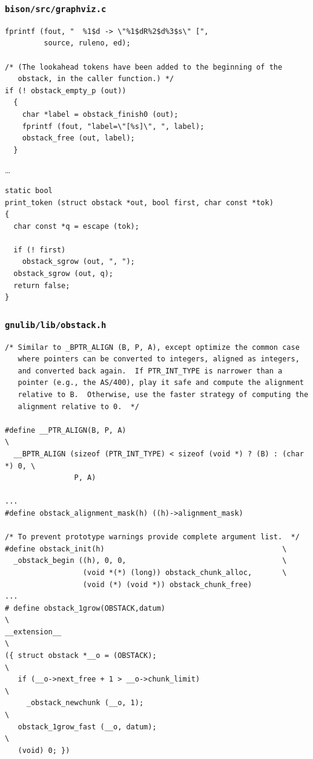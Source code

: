 \documentclass{beamer}
\begin{document}
\begin{frame}[fragile,shrink=25]
  \frametitle{\texttt{bison/src/graphviz.c}}
\begin{verbatim}
fprintf (fout, "  %1$d -> \"%1$dR%2$d%3$s\" [",
         source, ruleno, ed);

/* (The lookahead tokens have been added to the beginning of the
   obstack, in the caller function.) */
if (! obstack_empty_p (out))
  {
    char *label = obstack_finish0 (out);
    fprintf (fout, "label=\"[%s]\", ", label);
    obstack_free (out, label);
  }
\end{verbatim}
\ldots
\begin{verbatim}
static bool
print_token (struct obstack *out, bool first, char const *tok)
{
  char const *q = escape (tok);

  if (! first)
    obstack_sgrow (out, ", ");
  obstack_sgrow (out, q);
  return false;
}
\end{verbatim}
\end{frame}

\begin{frame}[fragile,shrink=25]
  \frametitle{\texttt{gnulib/lib/obstack.h}}
\begin{verbatim}
/* Similar to _BPTR_ALIGN (B, P, A), except optimize the common case
   where pointers can be converted to integers, aligned as integers,
   and converted back again.  If PTR_INT_TYPE is narrower than a
   pointer (e.g., the AS/400), play it safe and compute the alignment
   relative to B.  Otherwise, use the faster strategy of computing the
   alignment relative to 0.  */

#define __PTR_ALIGN(B, P, A)                                                \
  __BPTR_ALIGN (sizeof (PTR_INT_TYPE) < sizeof (void *) ? (B) : (char *) 0, \
                P, A)

...
#define obstack_alignment_mask(h) ((h)->alignment_mask)

/* To prevent prototype warnings provide complete argument list.  */
#define obstack_init(h)                                         \
  _obstack_begin ((h), 0, 0,                                    \
                  (void *(*) (long)) obstack_chunk_alloc,       \
                  (void (*) (void *)) obstack_chunk_free)
...
# define obstack_1grow(OBSTACK,datum)                                   \
__extension__                                                           \
({ struct obstack *__o = (OBSTACK);                                     \
   if (__o->next_free + 1 > __o->chunk_limit)                           \
     _obstack_newchunk (__o, 1);                                        \
   obstack_1grow_fast (__o, datum);                                     \
   (void) 0; })
\end{verbatim}
\end{frame}
\end{document}
